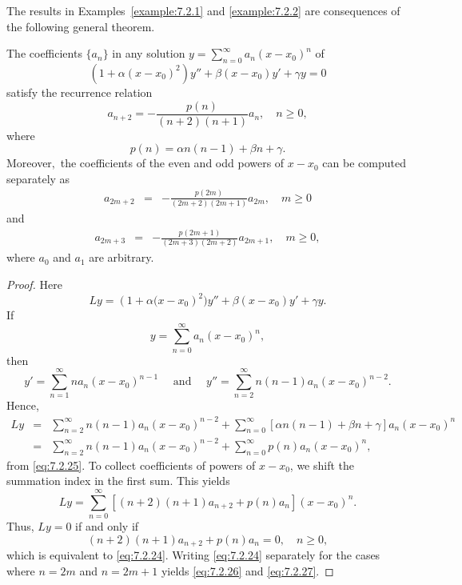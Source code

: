 \documentclass{ximera}
\begin{document}
The results in Examples~\ref{example:7.2.1} and \ref{example:7.2.2} are
consequences of the following general theorem.

\begin{theorem}\label{thmtype:7.2.2}
The coefficients $\{a_n\}$ in any solution
$y=\sum_{n=0}^\infty a_n(x-x_0)^n$ of
\begin{equation}\label{eq:7.2.23}
\left(1+\alpha(x-x_0)^2\right)y''+\beta(x-x_0) y'+\gamma y=0
\end{equation}
satisfy the recurrence relation
\begin{equation}\label{eq:7.2.24}
a_{n+2}=-\frac{p(n)}{(n+2)(n+1)}a_n,\quad  n\geq0,
\end{equation}
where
\begin{equation}\label{eq:7.2.25}
p(n)=\alpha n(n-1) +\beta n+\gamma.
\end{equation}
Moreover$,$ the coefficients of the even and odd powers of $x-x_0$ can
be computed separately as
\begin{eqnarray}
a_{2m+2}&=&-\frac{p(2m)}{(2m+2)(2m+1)}a_{2m},\quad m\geq0\label{eq:7.2.26}
\end{eqnarray}
and
\begin{eqnarray}
a_{2m+3}&=&-\frac{p(2m+1)}{(2m+3)(2m+2)}a_{2m+1},\quad m\geq0, \label{eq:7.2.27}
\end{eqnarray}
where $a_0$ and $a_1$ are arbitrary.
\end{theorem}

\begin{proof}
Here
$$
Ly=\left(1+\alpha(x-x_0\right)^2)y''+\beta(x-x_0) y'+\gamma y.
$$
If
$$
y=\sum_{n=0}^\infty a_n(x-x_0)^n,
$$
then
$$
y'=\sum_{n=1}^\infty na_n(x-x_0)^{n-1}
\quad\mbox{ and }\quad y''=\sum_{n=2}^\infty n(n-1)a_n(x-x_0)^{n-2}.
$$
Hence,
$$
\begin{array}{ccl}
Ly&=&\sum_{n=2}^\infty n(n-1)a_n(x-x_0)^{n-2}+
\sum_{n=0}^\infty \left[\alpha
n(n-1)
+\beta n+\gamma\right]a_n(x-x_0)^n\\
&=&\sum_{n=2}^\infty n(n-1)a_n(x-x_0)^{n-2}+\sum_{n=0}^\infty
p(n)a_n(x-x_0)^n,
\end{array}
$$
from \eqref{eq:7.2.25}.  To collect coefficients of powers of $x-x_0$,
we shift the summation index in the first sum. This yields
$$
Ly=\sum_{n=0}^\infty \left[(n+2)(n+1)a_{n+2}+p(n)a_n\right](x-x_0)^n.
$$
Thus, $Ly=0$ if and only if
$$
(n+2)(n+1)a_{n+2}+p(n)a_n=0,\quad n\geq0,
$$
which is equivalent to \eqref{eq:7.2.24}. Writing \eqref{eq:7.2.24} separately
for the cases where $n=2m$ and $n=2m+1$ yields \eqref{eq:7.2.26} and
\eqref{eq:7.2.27}.
\end{proof}
\end{document}

